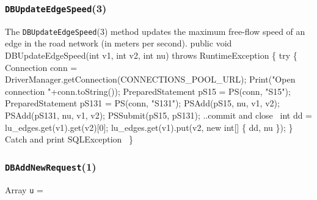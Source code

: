 \documentclass{article}
\def\nwendcode{\endtrivlist \endgroup}      %
\let\nwdocspar=\par
\theoremstyle{definition}                   %
\begin{document}
\subsubsection{{\tt{}\protect{}DBUpdateEdgeSpeed}(3)}
The {\tt{}\protect{}DBUpdateEdgeSpeed}(3) method updates the maximum free-flow speed of an
edge in the road network (in meters per second).
\nwenddocs{}\endmoddef{}
public void DBUpdateEdgeSpeed(int v1, int v2, int nu) throws RuntimeException \{
  try \{
    Connection conn = DriverManager.getConnection(CONNECTIONS_POOL_URL);
    Print("Open connection "+conn.toString());
    PreparedStatement pS15 = PS(conn, "S15");
    PreparedStatement pS131 = PS(conn, "S131");
    PSAdd(pS15, nu, v1, v2);
    PSAdd(pS131, nu, v1, v2);
    PSSubmit(pS15, pS131);
    \LA{}..commit and close~{\nwtagstyle{}}\RA{}
    int dd = lu_edges.get(v1).get(v2)[0];
    lu_edges.get(v1).put(v2, new int[] \{ dd, nu \});
  \}
  \LA{}Catch and print \code{}SQLException\edoc{}~{\nwtagstyle{}}\RA{}
\}
\eatline
{}\nwendcode{}\nwdocspar
\subsubsection{{\tt{}\protect{}DBAddNewRequest}(1)}
Array {\tt{}u} =
\end{document}
